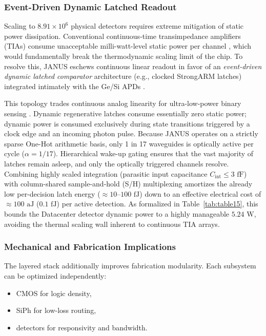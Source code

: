 \documentclass[journal]{IEEEtran}
\begin{document}
\subsubsection{\textbf{Event-Driven Dynamic Latched Readout}}

Scaling to $8.91 \times 10^{6}$ physical detectors requires extreme mitigation of static power dissipation. Conventional continuous-time transimpedance amplifiers (TIAs) consume unacceptable milli-watt-level static power per channel \cite{Achtenberg2025}, which would fundamentally break the thermodynamic scaling limit of the chip. To resolve this, JANUS eschews continuous linear readout in favor of an \textit{event-driven dynamic latched comparator} architecture (e.g., clocked StrongARM latches) integrated intimately with the Ge/Si APDs \cite{Modak2025,Claveau2024}. 

This topology trades continuous analog linearity for ultra-low-power binary sensing \cite{Zheng2025,Severini2023}. Dynamic regenerative latches consume essentially zero static power; dynamic power is consumed exclusively during state transitions triggered by a clock edge and an incoming photon pulse. Because JANUS operates on a strictly sparse One-Hot arithmetic basis, only 1 in 17 waveguides is optically active per cycle ($\alpha = 1/17$). Hierarchical wake-up gating ensures that the vast majority of latches remain asleep, and only the optically triggered channels resolve. Combining highly scaled integration (parasitic input capacitance $C_{\text{int}} \le 3\text{ fF}$) \cite{Laube2024} with column-shared sample-and-hold (S/H) multiplexing \cite{Mulberry2018} amortizes the already low per-decision latch energy ($\approx 10\text{--}100\text{ fJ}$) down to an effective electrical cost of $\approx 100\text{ aJ}$ ($0.1\text{ fJ}$) per active detection. As formalized in Table~\ref{tab:table15}, this bounds the Datacenter detector dynamic power to a highly manageable $5.24\text{ W}$, avoiding the thermal scaling wall inherent to continuous TIA arrays.

\subsubsection{\textbf{Mechanical and Fabrication Implications}}

The layered stack additionally improves fabrication modularity. Each subsystem can be optimized independently:
\begin{itemize}
\item  CMOS for logic density,
\item  SiPh for low-loss routing,
\item  detectors for responsivity and bandwidth.
\end{itemize}
\end{document}
